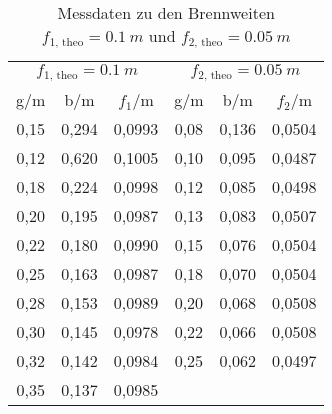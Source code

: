 \begin{table}[h!]
  \centering
  \caption{Messdaten zu den Brennweiten $f_{\text{1, theo}}=\SI{0.1}{m}$ und $f_{\text{2, theo}}=\SI{0.05}{m}$}
  \label{tab:brennweite}
  \begin{tabular}{c c c c c c}
    \toprule
    \multicolumn{3}{c}{$f_{\text{1, theo}}=\SI{0.1}{m}$} & \multicolumn{3}{c}{$f_{\text{2, theo}}=\SI{0.05}{m}$}\\
      g/m     &   b/m     &   $f_{1}$/m   &   g/m     &   b/m   &   $f_{2}$/m\\
      \midrule
      0,15    &   0,294   &   0,0993    &   0,08    &   0,136   &   0,0504  \\
      0,12    &   0,620   &   0,1005    &   0,10    &   0,095   &   0,0487  \\
      0,18    &   0,224   &   0,0998    &   0,12    &   0,085   &   0,0498  \\
      0,20    &   0,195   &   0,0987    &   0,13    &   0,083   &   0,0507  \\
      0,22    &   0,180   &   0,0990    &   0,15    &   0,076   &   0,0504  \\
      0,25    &   0,163   &   0,0987    &   0,18    &   0,070   &   0,0504  \\
      0,28    &   0,153   &   0,0989    &   0,20    &   0,068   &   0,0508  \\
      0,30    &   0,145   &   0,0978    &   0,22    &   0,066   &   0,0508  \\
      0,32    &   0,142   &   0,0984    &   0,25    &   0,062   &   0,0497  \\
      0,35    &   0,137   &   0,0985    &   \\

    \bottomrule
  \end{tabular}
\end{table}

%
